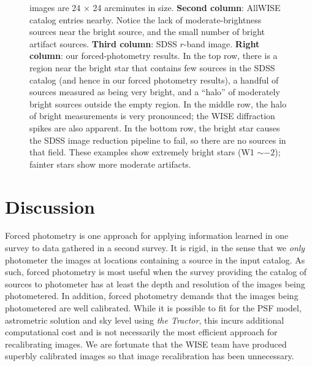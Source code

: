 \documentclass[12pt,preprint]{aastex}
\newcommand{\thetractor}{\textsl{the Tractor}}
\begin{document}
\begin{figure}
{    images are 24 $\times$ 24 arcminutes in size.  \textbf{Second
      column}: AllWISE catalog entries nearby.  Notice the lack of
    moderate-brightness sources near the bright source, and the small
    number of bright artifact sources.  \textbf{Third column}: SDSS
    $r$-band image.  \textbf{Right column}: our forced-photometry
    results.  In the top row, there is a region near the bright star
    that contains few sources in the SDSS catalog (and hence in our
    forced photometry results), a handful of sources measured as being
    very bright, and a ``halo'' of moderately bright sources outside
    the empty region.  In the middle row, the halo of bright
    measurements is very pronounced; the WISE diffraction spikes are
    also apparent.  In the bottom row, the bright star causes the SDSS
    image reduction pipeline to fail, so there are no sources in that
    field.  These examples show extremely bright stars (W1 $\sim -2$);
    fainter stars show more moderate artifacts.
    \label{fig:bright}}
\end{figure}



\section{Discussion}

Forced photometry is one approach for applying information learned in
one survey to data gathered in a second survey.  It is rigid, in the
sense that we \emph{only} photometer the images at locations
containing a source in the input catalog.
%
As such, forced photometry is most useful when the survey providing
the catalog of sources to photometer has at least the depth and
resolution of the images being photometered.
%
In addition, forced photometry demands that the images being
photometered are well calibrated.  While it is possible to fit for the
PSF model, astrometric solution and sky level using \thetractor, this
incurs additional computational cost and is not necessarily the most
efficient approach for recalibrating images.  We are fortunate that
the WISE team have produced superbly calibrated images so that image
recalibration has been unnecessary.
\end{document}
